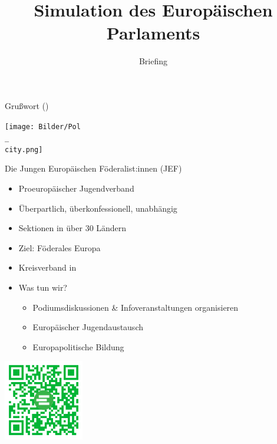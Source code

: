 \documentclass{beamer}
\title{Simulation des Europäischen Parlaments}
\subtitle{Briefing}
\date{\datum}
\begin{document}
\frame{\titlepage}

\begin{frame}{Grußwort \politiker \newline (\politikerOffice)}
\vspace{-1cm}
    \begin{center}
        \texttt{[image: Bilder/Pol\\\_\\city.png]}
    \end{center}
\end{frame}

\begin{frame}{Die Jungen Europäischen Föderalist:innen (JEF)}
    \begin{minipage}[t]{0.7\textwidth}
    \vspace{-3.5cm}
        \begin{itemize}
            \item Proeuropäischer Jugendverband
            \item Überpartlich, überkonfessionell, unabhängig
            \item Sektionen in über 30 Ländern
            \item Ziel: Föderales Europa
            \item Kreisverband in \city
            \newline
            \item Was tun wir?
            \begin{itemize}
                \item Podiumsdiskussionen \& Infoveranstaltungen organisieren
                \item Europäischer Jugendaustausch
                \item Europapolitische Bildung
            \end{itemize}
        \end{itemize}
    \end{minipage}%
    \begin{minipage}[t]{0.25\textwidth}
        \includegraphics[height=3.5cm]{Bilder/mitmachen.png}
    \end{minipage}
\end{frame}
\end{document}
